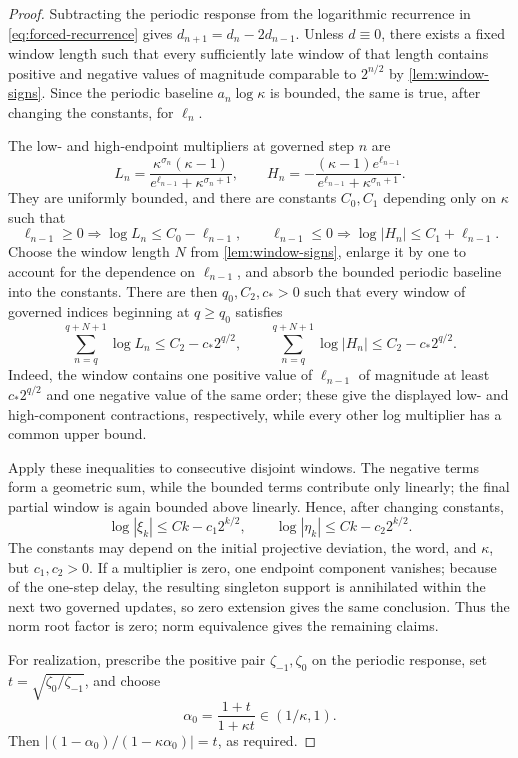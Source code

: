 \documentclass[letterpaper,twoside]{article}
\begin{document}
\begin{proof}
Subtracting the periodic response from the logarithmic recurrence in
\eqref{eq:forced-recurrence} gives
$d_{n+1}=d_n-2d_{n-1}$.  Unless $d\equiv0$, there exists a fixed window length such that every sufficiently late window of that length contains
positive and negative values of magnitude comparable to $2^{n/2}$ by
\cref{lem:window-signs}.  Since the periodic baseline $a_n\log\kappa$ is
bounded, the same is true, after changing the constants, for $\ell_n$.

The low- and high-endpoint multipliers at governed step $n$ are
\[
 L_n=\frac{\kappa^{\sigma_n}(\kappa-1)}
 {e^{\ell_{n-1}}+\kappa^{\sigma_n+1}},
 \qquad
 H_n=-\frac{(\kappa-1)e^{\ell_{n-1}}}
 {e^{\ell_{n-1}}+\kappa^{\sigma_n+1}}.
\]
They are uniformly bounded, and there are constants $C_0,C_1$ depending only
on $\kappa$ such that
\[
 \ell_{n-1}\ge0\Longrightarrow \log L_n\le C_0-\ell_{n-1},
 \qquad
 \ell_{n-1}\le0\Longrightarrow \log|H_n|\le C_1+\ell_{n-1}.
\]
Choose the window length $N$ from \cref{lem:window-signs}, enlarge it by one
to account for the dependence on $\ell_{n-1}$, and absorb the bounded periodic
baseline into the constants.  There are then $q_0,C_2,c_*>0$ such that every
window of governed indices beginning at $q\ge q_0$ satisfies
\[
 \sum_{n=q}^{q+N+1}\log L_n\le C_2-c_* 2^{q/2},
 \qquad
 \sum_{n=q}^{q+N+1}\log|H_n|\le C_2-c_* 2^{q/2}.
\]
Indeed, the window contains one positive value of $\ell_{n-1}$ of magnitude at
least $c_* 2^{q/2}$ and one negative value of the same order; these give the
displayed low- and high-component contractions, respectively, while every
other log multiplier has a common upper bound.

Apply these inequalities to consecutive disjoint windows.  The negative
terms form a geometric sum, while the bounded terms contribute only
linearly; the final partial window is again bounded above linearly.  Hence,
after changing constants,
\[
 \log|\xi_k|\le Ck-c_1 2^{k/2},
 \qquad
 \log|\eta_k|\le Ck-c_2 2^{k/2}.
\]
The constants may depend on the initial projective deviation, the word, and
$\kappa$, but $c_1,c_2>0$.  If a multiplier is zero, one endpoint component
vanishes; because of the one-step delay, the resulting singleton support is
annihilated within the next two governed updates, so zero extension gives the
same conclusion.  Thus the norm root factor is zero; norm equivalence gives
the remaining claims.

For realization, prescribe the positive pair $\zeta_{-1},\zeta_0$ on the
periodic response, set $t=\sqrt{\zeta_0/\zeta_{-1}}$, and choose
\begin{equation}\label{eq:warmup-realization}
 \alpha_0=\frac{1+t}{1+\kappa t}\in(1/\kappa,1).
\end{equation}
Then
$|(1-\alpha_0)/(1-\kappa\alpha_0)|=t$, as required.
\end{proof}
\end{document}
